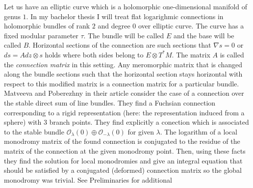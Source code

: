 \documentclass[../main.tex]{subfiles}
\begin{document}
    Let us have an elliptic curve which is a holomorphic one-dimensional
    manifold of genus $1$.
    In my bachelor thesis I will treat flat logarighmic connections
    in holomorphic bundles of rank $2$ and degree $0$ over elliptic curve.
    The curve has a fixed modular parameter $\tau$.
    The bundle will be called $E$ and the base will be called $B$.
%
    Horizontal sections of the connection are such sections that
    $\nabla s = 0$ or $d s = A dz \otimes s $ holds where both sides belong to
    $E \otimes T^*M$. The matrix $A$ is called the \textit{connection matrix} in this setting. 
    Any  meromorphic matrix that is changed along the bundle sections
    such that the horizontal section stays horizontal with
    respect to this modified matrix is a
    connection matrix for a particular bundle.
    Matveeva and Poberezhny in their article \cite{matveeva2017two} consider the case of a connection over the stable direct sum of line bundles.
    They find a Fuchsian connection corresponding to a rigid representation
    (here: the representation induced from a sphere) with $3$ branch points.
    They find explicitly a conection which is associated to the stable bundle
    $\mathcal{O}_{\lambda} (0) \oplus \mathcal{O}_{-\lambda} (0)$ for
    given $\lambda$.
    The logarithm of a local monodromy matrix of the found connection is conjugated to
    the residue of the matrix of the connection at the given monodromy point.
    Then, using these facts they find the solution for local monodromies and
    give an integral equation that should be
    satisfied by a conjugated (deformed) connection matrix so the global
    monodromy was trivial. See Preliminaries for additional
\end{document}
